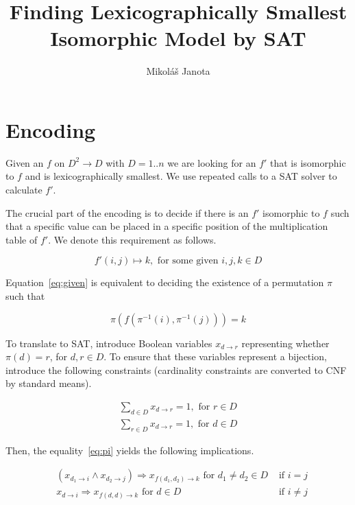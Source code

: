 \documentclass[11pt]{article}
\title{Finding Lexicographically Smallest Isomorphic Model by SAT}
\author{Mikol\'a\v{s} Janota}
\newcommand{\xpi}[2]{x_{{#1}\rightarrow{#2}}}
\begin{document}
\maketitle

\section{Encoding}

Given an $f$ on $D^2\rightarrow D$ with $D=1..n$ we are looking for an $f'$ that is
isomorphic to $f$ and is lexicographically smallest. We use repeated calls
to a SAT solver to calculate $f'$.

The crucial part of the encoding is to decide if there is an $f'$ isomorphic to
$f$ such that a specific value can be placed in a specific position of the
multiplication table of $f'$. We denote this requirement as follows.

\begin{equation}\label{eq:given}
  f'(i,j)\mapsto k, \text{ for some  given } i,j,k\in D
\end{equation}

Equation~\eqref{eq:given}  is equivalent to deciding the existence of a permutation $\pi$ such that

\begin{equation}\label{eq:pi}
  \pi\left(f(\pi^{-1}(i),\pi^{-1}(j))\right) = k
\end{equation}

To translate to SAT, introduce Boolean variables $\xpi{d}{r}$ representing
whether $\pi(d)=r$, for $d,r\in D$. To ensure that these variables represent a
bijection, introduce the following constraints (cardinality constraints are
converted to CNF by standard means).

\begin{align}
  \sum_{d\in D} \xpi{d}{r}=1, \text{ for } r\in D\\
  \sum_{r\in D} \xpi{d}{r}=1, \text{ for } d\in D
\end{align}

Then, the equality~\eqref{eq:pi} yields the following implications.

\begin{align}
  & \left(\xpi{d_1}{i}\land\xpi{d_2}{j}\right)\Rightarrow\xpi{f(d_1, d_2)}{k} \text{ for } d_1\neq d_2\in D
 &   \text{ if } i=j\\
  &  \xpi{d}{i}\Rightarrow\xpi{f(d, d)}{k} \text{ for } d\in D  & \text{ if } i\neq j
\end{align}
\end{document}
